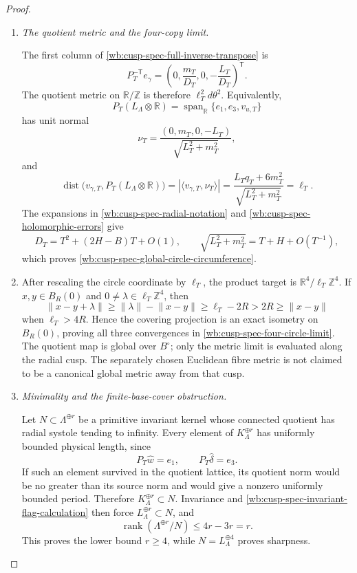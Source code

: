 \begin{proof}
\begin{enumerate}[label=\arabic*.,leftmargin=*]
\item \medskip\noindent\emph{The quotient metric and the four-copy limit.}\par
The first column of
\cref{wb:cusp-spec-full-inverse-transpose} is
\begin{equation}
 P_T^{-\mathsf T}e_\gamma
 =\left(0,\frac{m_T}{D_T},0,-\frac{L_T}{D_T}\right)^{\mathsf T}.
 \label{wb:cusp-spec-circle-dual-vector}
\end{equation}
The quotient metric on \(\mathbb R/\mathbb Z\) is therefore
\(\ell_T^2d\theta^2\).  Equivalently,
\[
 P_T(L_\Lambda\otimes\mathbb R)
 =\operatorname{span}_{\mathbb R}\{e_1,e_3,v_{u,T}\}
\]
has unit normal
\[
 \nu_T=\frac{(0,m_T,0,-L_T)}{\sqrt{L_T^2+m_T^2}},
\]
and
\[
 \operatorname{dist}
 \bigl(v_{\gamma,T},P_T(L_\Lambda\otimes\mathbb R)\bigr)
 =\left|\langle v_{\gamma,T},\nu_T\rangle\right|
 =\frac{L_Tq_T+6m_T^2}{\sqrt{L_T^2+m_T^2}}
 =\ell_T.
\]
The expansions in
\cref{wb:cusp-spec-radial-notation} and \cref{wb:cusp-spec-holomorphic-errors} give
\[
 D_T=T^2+(2H-B)T+O(1),\qquad
 \sqrt{L_T^2+m_T^2}=T+H+O(T^{-1}),
\]
which proves \cref{wb:cusp-spec-global-circle-circumference}.

\item After rescaling the circle coordinate by \(\ell_T\), the product target is
\(\mathbb R^4/\ell_T\mathbb Z^4\).  If
\(x,y\in B_R(0)\) and \(0\ne\lambda\in\ell_T\mathbb Z^4\), then
\[
 \lVert x-y+\lambda\rVert
 \ge\lVert\lambda\rVert-\lVert x-y\rVert
 \ge\ell_T-2R>2R\ge\lVert x-y\rVert
\]
when \(\ell_T>4R\).  Hence the covering projection is an exact isometry
on \(B_R(0)\), proving all three convergences in
\cref{wb:cusp-spec-four-circle-limit}.  The quotient map is global over
\(B^\circ\); only the metric limit is evaluated along the radial cusp.
The separately chosen Euclidean fibre metric is not claimed to be a
canonical global metric away from that cusp.

\item \medskip\noindent\emph{Minimality and the finite-base-cover obstruction.}\par
Let \(N\subset\Lambda^{\oplus r}\) be a primitive invariant kernel whose
connected quotient has radial systole tending to infinity.  Every element
of \(K_\Lambda^{\oplus r}\) has uniformly bounded physical length, since
\[
 P_T\widehat w=e_1,\qquad P_T\widehat\delta=e_3.
\]
If such an element survived in the quotient lattice, its quotient norm
would be no greater than its source norm and would give a nonzero uniformly
bounded period.  Therefore \(K_\Lambda^{\oplus r}\subset N\).
Invariance and
\cref{wb:cusp-spec-invariant-flag-calculation} then force
\(L_\Lambda^{\oplus r}\subset N\), and
\[
 \operatorname{rank}(\Lambda^{\oplus r}/N)\le4r-3r=r.
\]
This proves the lower bound \(r\ge4\), while
\(N=L_\Lambda^{\oplus4}\) proves sharpness.


\end{enumerate}
\end{proof}
